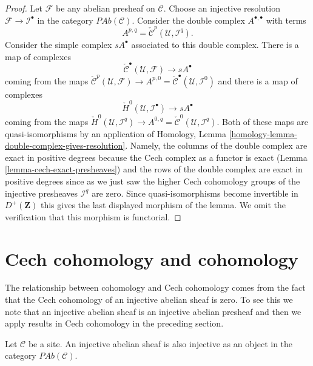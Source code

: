 \begin{proof}
\medskip\noindent
Let $\mathcal{F}$ be any abelian presheaf on $\mathcal{C}$.
Choose an injective resolution $\mathcal{F} \to \mathcal{I}^\bullet$
in the category $\textit{PAb}(\mathcal{C})$.
Consider the double complex $A^{\bullet, \bullet}$ with terms
$$
A^{p, q} =
\check{\mathcal{C}}^p(\mathcal{U}, \mathcal{I}^q).
$$
Consider the simple complex $sA^\bullet$ associated to this double
complex. There is a map of complexes
$$
\check{\mathcal{C}}^\bullet(\mathcal{U}, \mathcal{F})
\longrightarrow
sA^\bullet
$$
coming from the maps
$\check{\mathcal{C}}^p(\mathcal{U}, \mathcal{F})
\to A^{p, 0} = \check{\mathcal{C}}^\bullet(\mathcal{U}, \mathcal{I}^0)$
and there is a map of complexes
$$
\check{H}^0(\mathcal{U}, \mathcal{I}^\bullet)
\longrightarrow
sA^\bullet
$$
coming from the maps
$\check{H}^0(\mathcal{U}, \mathcal{I}^q) \to
A^{0, q} = \check{\mathcal{C}}^0(\mathcal{U}, \mathcal{I}^q)$.
Both of these maps are quasi-isomorphisms by an application of
Homology, Lemma \ref{homology-lemma-double-complex-gives-resolution}.
Namely, the columns of the double complex are exact in positive degrees
because the Cech complex as a functor is exact
(Lemma \ref{lemma-cech-exact-presheaves})
and the rows of the double complex are exact in positive degrees
since as we just saw the higher Cech cohomology groups of the injective
presheaves $\mathcal{I}^q$ are zero.
Since quasi-isomorphisms become invertible
in $D^{+}(\mathbf{Z})$ this gives the last displayed morphism
of the lemma. We omit the verification that this morphism is
functorial.
\end{proof}





\section{Cech cohomology and cohomology}
\label{section-cech-cohomology-cohomology}

\noindent
The relationship between cohomology and Cech cohomology comes from the fact
that the Cech cohomology of an injective abelian sheaf is zero. To see this
we note that an injective abelian sheaf is an injective abelian presheaf and
then we apply results in Cech cohomology in the preceding section.

\begin{lemma}
\label{lemma-injective-abelian-sheaf-injective-presheaf}
Let $\mathcal{C}$ be a site. An injective abelian sheaf is also injective as an
object in the category $\textit{PAb}(\mathcal{C})$.
\end{lemma}

